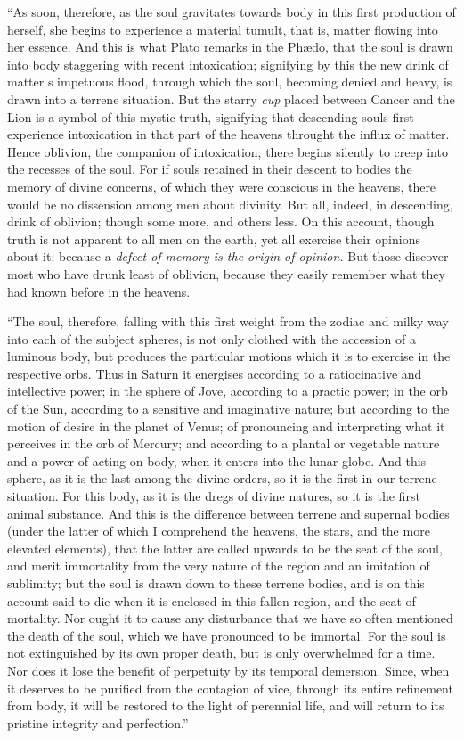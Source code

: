 \documentclass[12pt]{article}
\begin{document}
{``As soon, therefore, as the soul gravitates towards body in this first
production of herself, she begins to experience a material tumult, that is,
matter flowing into her essence. And this is what Plato remarks in the
Ph{\ae}do, that the soul is drawn into body staggering with recent
intoxication; signifying by this the new drink of matter s impetuous flood,
through which the soul, becoming denied and heavy, is drawn into a terrene
situation. But the starry \textit{cup} placed between Cancer and the Lion is a
symbol of this mystic truth, signifying that descending souls first experience
intoxication in that part of the heavens throught the influx of matter. Hence
oblivion, the companion of intoxication, there begins silently to creep into
the recesses of the soul. For if souls retained in their descent to bodies the
memory of divine concerns, of which they were conscious in the heavens, there
would be no dissension among men about divinity. But all, indeed, in
descending, drink of oblivion; though some more, and others less. On this
account, though truth is not apparent to all men on the earth, yet all exercise
their opinions about it; because a \textit{defect of memory is the origin of
opinion.} But those discover most who have drunk least of oblivion, because
they easily remember what they had known before in the heavens.

``The soul, therefore, falling with this first weight from the zodiac and milky
way into each of the subject spheres, is not only clothed with the accession of
a luminous body, but produces the particular motions which it is to exercise in
the respective orbs. Thus in Saturn it energises according to a ratiocinative
and intellective power; in the sphere of Jove, according to a practic power; in
the orb of the Sun, according to a sensitive and imaginative nature; but
according to the motion of desire in the planet of Venus; of pronouncing and
interpreting what it perceives in the orb of Mercury; and according to a
plantal or vegetable nature and a power of acting on body, when it enters into
the lunar globe. And this sphere, as it is the last among the divine orders, so
it is the first in our terrene situation. For this body, as it is the dregs of
divine natures, so it is the first animal substance. And this is the difference
between terrene and supernal bodies (under the latter of which I comprehend the
heavens, the stars, and the more elevated elements), that the latter are called
upwards to be the seat of the soul, and merit immortality from the very nature
of the region and an imitation of sublimity; but the soul is drawn down to
these terrene bodies, and is on this account said to die when it is enclosed in
this fallen region, and the seat of mortality. Nor ought it to cause any
disturbance that we have so often mentioned the death of the soul, which we
have pronounced to be immortal. For the soul is not extinguished by its own
proper death, but is only overwhelmed for a time. Nor does it lose the benefit
of perpetuity by its temporal demersion. Since, when it deserves to be purified
from the contagion of vice, through its entire refinement from body, it will be
restored to the light of perennial life, and will return to its pristine
integrity and perfection.''

}
\end{document}
